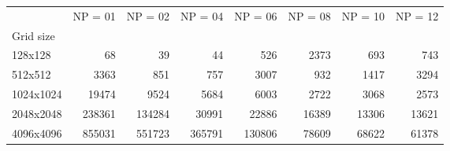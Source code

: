 \begin{tabular}{lrrrrrrr}
\toprule
{} &  NP = 01 &  NP = 02 &  NP = 04 &  NP = 06 &  NP = 08 &  NP = 10 &  NP = 12 \\
Grid size &          &          &          &          &          &          &          \\
\midrule
128x128   &       68 &       39 &       44 &      526 &     2373 &      693 &      743 \\
512x512   &     3363 &      851 &      757 &     3007 &      932 &     1417 &     3294 \\
1024x1024 &    19474 &     9524 &     5684 &     6003 &     2722 &     3068 &     2573 \\
2048x2048 &   238361 &   134284 &    30991 &    22886 &    16389 &    13306 &    13621 \\
4096x4096 &   855031 &   551723 &   365791 &   130806 &    78609 &    68622 &    61378 \\
\bottomrule
\end{tabular}
